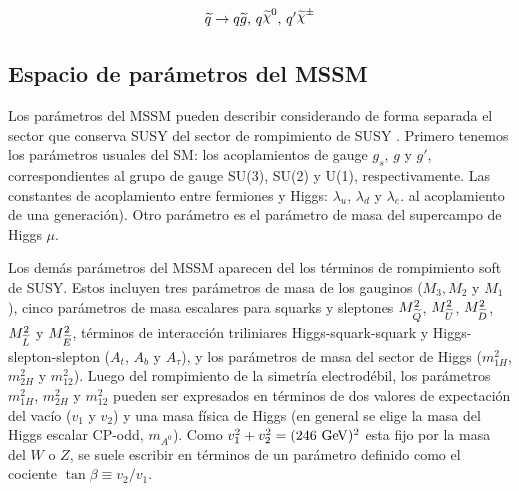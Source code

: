\begin{equation}
  \susy{q} \to q\gluino, \, q\nino, \, q^\prime \chinopm
\end{equation}



\subsection{Espacio de parámetros del MSSM}

Los parámetros del MSSM pueden describir considerando de forma separada el
sector que conserva SUSY del sector de rompimiento de SUSY
\cite{PDG,Haber:1993wf}. Primero tenemos los parámetros usuales del SM: los
acoplamientos de gauge $g_s$, $g$ y $g'$, correspondientes al grupo de gauge
SU(3), SU(2) y U(1), respectivamente. Las constantes de acoplamiento entre
fermiones y Higgs: $\lambda_u$, $\lambda_d$ y $\lambda_e$. %
al acoplamiento de una generación).
Otro parámetro es el parámetro de masa del supercampo de Higgs $\mu$.

Los demás parámetros del MSSM aparecen del los términos de rompimiento soft de
SUSY. Estos incluyen tres parámetros de masa de los gauginos ($M_3, M_2$ y
$M_1$), cinco parámetros de masa escalares para squarks y sleptones
$M^2_{\widetilde{Q}}$, $M^2_{\widetilde{U}}$, $M^2_{\widetilde{D}}$, $M^2_{\widetilde{L}}$ y
$M^2_{\widetilde{E}}$, términos de interacción triliniares Higgs-squark-squark y
Higgs-slepton-slepton ($A_t$, $A_b$ y $A_\tau$), y los parámetros de masa del
sector de Higgs ($m^2_{1H}$, $m^2_{2H}$ y $m^2_{12}$). Luego del rompimiento de
la simetría electrodébil, los parámetros $m^2_{1H}$, $m^2_{2H}$ y $m^2_{12}$
pueden ser expresados en términos de dos valores de expectación del vacío ($v_1$
y $v_2$) y una masa física de Higgs (en general se elige la masa del Higgs
escalar CP-odd, $m_{A^0}$). Como $v_1^2+v_2^2=(246 \gev)^2$ esta fijo por la
masa del $W$ o $Z$, se suele escribir en términos de un parámetro definido como
el cociente $\tan \beta \equiv v_2/v_1$.

